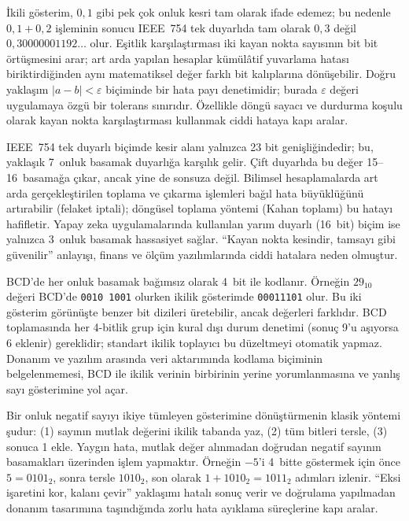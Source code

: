 İkili gösterim, $0{,}1$ gibi pek çok onluk kesri tam olarak ifade edemez; bu nedenle $0{,}1 + 0{,}2$ işleminin sonucu IEEE~754 tek duyarlıda tam olarak $0{,}3$ değil $0{,}30000001192\ldots$ olur. Eşitlik karşılaştırması iki kayan nokta sayısının bit bit örtüşmesini arar; art arda yapılan hesaplar kümülâtif yuvarlama hatası biriktirdiğinden aynı matematiksel değer farklı bit kalıplarına dönüşebilir. Doğru yaklaşım $|a - b| < \varepsilon$ biçiminde bir hata payı denetimidir; burada $\varepsilon$ değeri uygulamaya özgü bir tolerans sınırıdır. Özellikle döngü sayacı ve durdurma koşulu olarak kayan nokta karşılaştırması kullanmak ciddi hataya kapı aralar.

IEEE~754 tek duyarlı biçimde kesir alanı yalnızca 23 bit genişliğindedir; bu, yaklaşık 7~onluk basamak duyarlığa karşılık gelir. Çift duyarlıda bu değer 15--16~basamağa çıkar, ancak yine de sonsuza değil. Bilimsel hesaplamalarda art arda gerçekleştirilen toplama ve çıkarma işlemleri bağıl hata büyüklüğünü artırabilir (felaket iptali); döngüsel toplama yöntemi (Kahan toplamı) bu hatayı hafifletir. Yapay zeka uygulamalarında kullanılan yarım duyarlı (16~bit) biçim ise yalnızca 3~onluk basamak hassasiyet sağlar. ``Kayan nokta kesindir, tamsayı gibi güvenilir'' anlayışı, finans ve ölçüm yazılımlarında ciddi hatalara neden olmuştur.

BCD'de her onluk basamak bağımsız olarak 4~bit ile kodlanır. Örneğin $29_{10}$ değeri BCD'de \texttt{0010 1001} olurken ikilik gösterimde \texttt{00011101} olur. Bu iki gösterim görünüşte benzer bit dizileri üretebilir, ancak değerleri farklıdır. BCD toplamasında her 4-bitlik grup için kural dışı durum denetimi (sonuç 9'u aşıyorsa 6 eklenir) gereklidir; standart ikilik toplayıcı bu düzeltmeyi otomatik yapmaz. Donanım ve yazılım arasında veri aktarımında kodlama biçiminin belgelenmemesi, BCD ile ikilik verinin birbirinin yerine yorumlanmasına ve yanlış sayı gösterimine yol açar.

Bir onluk negatif sayıyı ikiye tümleyen gösterimine dönüştürmenin klasik yöntemi şudur: (1) sayının mutlak değerini ikilik tabanda yaz, (2) tüm bitleri tersle, (3) sonuca 1 ekle. Yaygın hata, mutlak değer alınmadan doğrudan negatif sayının basamakları üzerinden işlem yapmaktır. Örneğin $-5$'i 4~bitte göstermek için önce $5 = 0101_2$, sonra tersle $1010_2$, son olarak $1 + 1010_2 = 1011_2$ adımları izlenir. ``Eksi işaretini kor, kalanı çevir'' yaklaşımı hatalı sonuç verir ve doğrulama yapılmadan donanım tasarımına taşındığında zorlu hata ayıklama süreçlerine kapı aralar.

